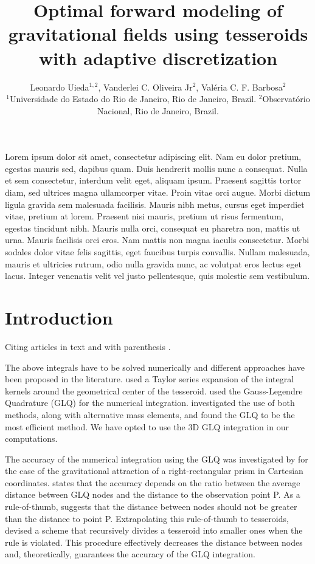 \documentclass[extra]{gji}
\title[Optimal forward modeling using tesseroids]{
    Optimal forward modeling of gravitational fields
    using tesseroids with adaptive discretization
}
\author[Uieda et al.]{
    Leonardo Uieda$^{1,2}$,
    Vanderlei C. Oliveira Jr$^2$,
    Val\'eria C. F. Barbosa$^2$
    \\
    $^1$Universidade do Estado do Rio de Janeiro, Rio de Janeiro, Brazil.
    $^2$Observat\'orio Nacional, Rio de Janeiro, Brazil.
}
\begin{document}
\label{firstpage}
\maketitle


\begin{summary}
Lorem ipsum dolor sit amet, consectetur adipiscing elit. Nam eu dolor pretium,
egestas mauris sed, dapibus quam. Duis hendrerit mollis nunc a consequat. Nulla
et sem consectetur, interdum velit eget, aliquam ipsum. Praesent sagittis
tortor diam, sed ultrices magna ullamcorper vitae. Proin vitae orci augue.
Morbi dictum ligula gravida sem malesuada facilisis. Mauris nibh metus, cursus
eget imperdiet vitae, pretium at lorem. Praesent nisi mauris, pretium ut risus
fermentum, egestas tincidunt nibh. Mauris nulla orci, consequat eu pharetra
non, mattis ut urna. Mauris facilisis orci eros. Nam mattis non magna iaculis
consectetur. Morbi sodales dolor vitae felis sagittis, eget faucibus turpis
convallis. Nullam malesuada, mauris et ultricies rutrum, odio nulla gravida
nunc, ac volutpat eros lectus eget lacus. Integer venenatis velit vel justo
pellentesque, quis molestie sem vestibulum.
\end{summary}

\section{Introduction}

Citing articles in text \citet{Asgharzadeh2007} and with parenthesis
\citep{Braitenberg2011}.

The above integrals
have to be solved numerically
\citep{Wild-Pfeiffer2008}
and different approaches have been proposed in the literature.
\citet{Heck2007}
used a Taylor series expansion
of the integral kernels
around the geometrical center of the tesseroid.
\citet{Asgharzadeh2007}
used the Gauss-Legendre Quadrature (GLQ)
for the numerical integration.
\citet{Wild-Pfeiffer2008} investigated
the use of both methods,
along with alternative mass elements,
and found the GLQ to be the most efficient method.
We have opted to use
the 3D GLQ integration in our computations.

The accuracy of the numerical integration
using the GLQ
was investigated by \citet{Ku1977}
for the case of
the gravitational attraction of
a right-rectangular prism
in Cartesian coordinates.
\citet{Ku1977} states that the accuracy
depends on the ratio between
the average distance between GLQ nodes
and the distance to the observation point P.
As a rule-of-thumb,
\citet{Ku1977} suggests that
the distance between nodes
should not be greater than
the distance to point P.
Extrapolating this rule-of-thumb
to tesseroids,
\citet{Li2011}
devised a scheme that
recursively divides a tesseroid
into smaller ones when the rule is violated.
This procedure
effectively decreases the distance between nodes
and, theoretically, guarantees the accuracy of the GLQ integration.
\end{document}
